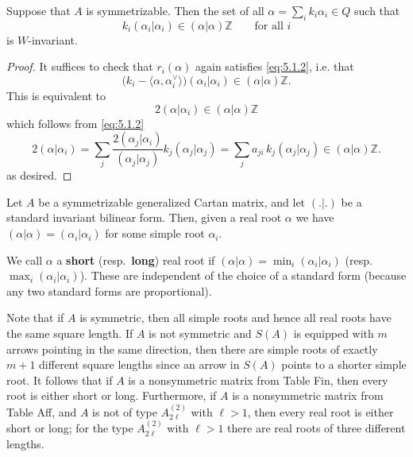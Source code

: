 \documentclass[12pt]{article}
\begin{document}
\begin{lemma}\label{lem:5.1.1}
Suppose that $A$ is symmetrizable. Then the set of all 
$\alpha = \sum_i k_i \alpha_i \in Q$ such that
\begin{equation}\label{eq:5.1.2}
    k_i (\alpha_i|\alpha_i) \in (\alpha|\alpha)\mathbb{Z} 
    \qquad \text{for all $i$}
\end{equation}
is $W$-invariant.
\end{lemma}

\begin{proof}
It suffices to check that $r_i(\alpha)$ again satisfies \ref{eq:5.1.2}, i.e. that
\[
   \big(k_i - \langle \alpha,\alpha_i^\vee\rangle\big)(\alpha_i|\alpha_i) 
   \in (\alpha|\alpha)\mathbb{Z}.
\]
This is equivalent to
\begin{equation}\label{eq:5.1.3}
   2(\alpha|\alpha_i) \in (\alpha|\alpha)\mathbb{Z}
\end{equation}
which follows from \ref{eq:5.1.2}
\[
   2(\alpha|\alpha_i) 
   = \sum_j \frac{2(\alpha_j|\alpha_i)}{(\alpha_j|\alpha_j)} 
       k_j(\alpha_j|\alpha_j)
   = \sum_j a_{ji}\,k_j(\alpha_j|\alpha_j) 
   \in (\alpha|\alpha)\mathbb{Z}.
\]
as desired.
\end{proof}

Let $A$ be a symmetrizable generalized Cartan matrix, and let $(.|.)$ be a 
standard invariant bilinear form. Then, given a real root $\alpha$ we 
have $(\alpha|\alpha) = (\alpha_i|\alpha_i)$ for some simple root $\alpha_i$. 

\begin{definition}
We call $\alpha$ a \textbf{short} (resp.\ \textbf{long}) real root if 
$(\alpha|\alpha) = \min_i(\alpha_i|\alpha_i)$ (resp.\ 
$\max_i(\alpha_i|\alpha_i)$). These are independent of the choice of a standard 
form (because any two standard forms are proportional). 
\end{definition}
Note that if $A$ is symmetric, then all simple roots and hence all real 
roots have the same square length. If $A$ is not symmetric and $S(A)$ is equipped 
with $m$ arrows pointing in the same direction, then there are simple roots of 
exactly $m+1$ different square lengths since an arrow in $S(A)$ points to a 
shorter simple root. It follows that if $A$ is a nonsymmetric matrix from Table 
Fin, then every root is either short or long. Furthermore, if $A$ is a nonsymmetric  matrix from Table Aff, and $A$ is not of type $A_{2\ell}^{(2)}$ with $\ell > 1$, then every real root is either short or long; for the type $A_{2\ell}^{(2)}$ with 
$\ell > 1$ there are real roots of three different lengths.
\end{document}

